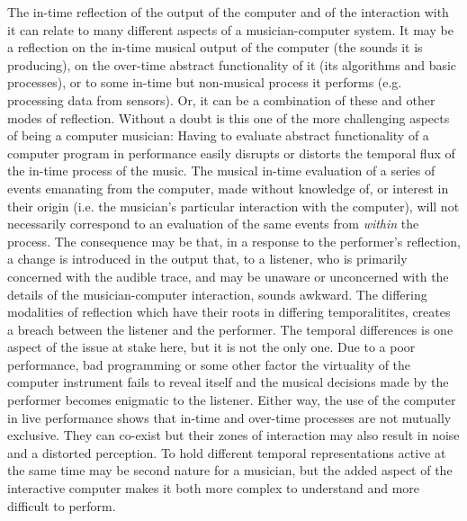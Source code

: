 The in-time reflection of the output of the computer and of the interaction with it can relate to many different aspects of a musician-computer system. It may be a reflection on the in-time musical output of the computer (the sounds it is producing), on the over-time abstract functionality of it (its algorithms and basic processes), or to some in-time but non-musical process it performs (e.g. processing data from sensors). Or, it can be a combination of these and other modes of reflection. Without a doubt is this one of the more challenging aspects of being a computer musician: Having to evaluate abstract functionality of a computer program in performance easily disrupts or distorts the temporal flux of the in-time process of the music. The musical in-time evaluation of a series of events emanating from the computer, made without knowledge of, or interest in their origin (i.e. the musician's particular interaction with the computer), will not necessarily correspond to an evaluation of the same events from \emph{within} the process. The consequence may be that, in a response to the performer's reflection, a change is introduced in the output that, to a listener, who is primarily concerned with the audible trace, and may be unaware or unconcerned with the details of the musician-computer interaction, sounds awkward. The differing modalities of reflection which have their roots in differing temporalitites, creates a breach between the listener and the performer. The temporal differences is one aspect of the issue at stake here, but it is not the only one. 
Due to a poor performance, bad programming or some other factor the virtuality of the computer instrument fails to reveal itself and the musical decisions made by the performer becomes enigmatic to the listener.
Either way, the use of the computer in live performance shows that in-time and over-time processes are not mutually exclusive. They can co-exist but their zones of interaction may also result in noise and a distorted perception. To hold different temporal representations active at the same time may be second nature for a musician, but the added aspect of the interactive computer makes it both more complex to understand and more difficult to perform.



